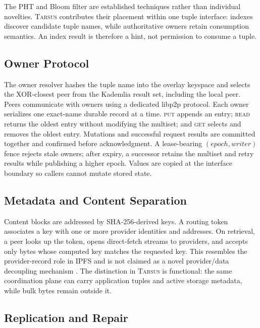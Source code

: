 \documentclass[conference]{IEEEtran}
\newcommand{\system}{\textsc{Tarsus}\xspace}
\newcommand{\putop}{\textsc{put}\xspace}
\newcommand{\readop}{\textsc{read}\xspace}
\newcommand{\getop}{\textsc{get}\xspace}
\begin{document}
The PHT and Bloom filter are established techniques rather than individual
novelties. \system contributes their placement within one tuple interface:
indexes discover candidate tuple names, while authoritative owners retain
consumption semantics. An index result is therefore a hint, not permission to
consume a tuple.

\subsection{Owner Protocol}

The owner resolver hashes the tuple name into the overlay keyspace and selects
the XOR-closest peer from the Kademlia result set, including the local peer.
Peers communicate with owners using a dedicated libp2p protocol. Each owner
serializes one exact-name durable record at a time. \putop appends an entry;
\readop returns the oldest entry without modifying the multiset; and \getop
selects and removes the oldest entry. Mutations and successful request results
are committed together and confirmed before acknowledgment. A lease-bearing
$(epoch,writer)$ fence rejects stale owners; after expiry, a successor retains
the multiset and retry results while publishing a higher epoch. Values are
copied at the interface boundary so callers cannot mutate stored state.

\subsection{Metadata and Content Separation}

Content blocks are addressed by SHA-256-derived keys. A routing token associates
a key with one or more provider identities and addresses. On retrieval, a peer
looks up the token, opens direct-fetch streams to providers, and accepts only
bytes whose computed key matches the requested key. This resembles the
provider-record role in IPFS and is not claimed as a novel provider/data
decoupling mechanism \cite{Trautwein2022,IPFSKademliaSpec}. The distinction in
\system is functional: the same coordination plane can carry application
tuples and active storage metadata, while bulk bytes remain outside it.

\subsection{Replication and Repair}
\end{document}
